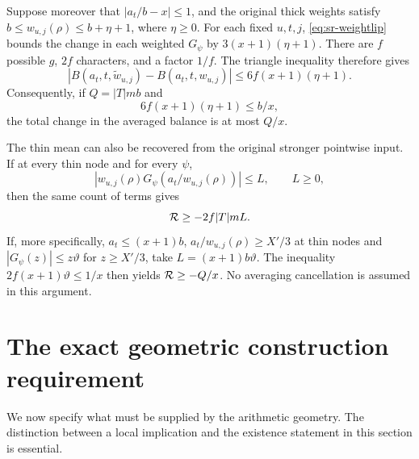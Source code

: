 Suppose moreover that \(|a_t/b-x|\leq1\), and the original thick weights
satisfy \(b\leq w_{u,j}(\rho)\leq b+\eta+1\), where \(\eta\geq0\).
For each fixed \(u,t,j\), \eqref{eq:sr-weightlip} bounds the change in
each weighted \(G_\psi\) by
\(3(x+1)(\eta+1)\).
There are \(f\) possible \(g\), \(2f\) characters, and a factor \(1/f\).
The triangle inequality therefore gives
\[
 |B(a_t,t,\widetilde w_{u,j})-B(a_t,t,w_{u,j})|
 \leq6f(x+1)(\eta+1).
\]
Consequently, if \(Q=|T|mb\) and
\begin{equation}\label{eq:sr-repair}
 6f(x+1)(\eta+1)\leq b/x,
\end{equation}
the total change in the averaged balance is at most \(Q/x\).

The thin mean can also be recovered from the original stronger
pointwise input. If at every thin node and for every \(\psi\),
\[
 |w_{u,j}(\rho)G_\psi(a_t/w_{u,j}(\rho))|\leq L,\qquad L\geq0,
\]
then the same count of terms gives
\begin{equation}\label{eq:sr-thin}
 {\cal R}\geq-2f|T|mL.
\end{equation}
If, more specifically, \(a_t\leq(x+1)b\),
\(a_t/w_{u,j}(\rho)\geq X'/3\) at thin nodes and
\(|G_\psi(z)|\leq z\vartheta\) for \(z\geq X'/3\), take
\(L=(x+1)b\vartheta\).
The inequality \(2f(x+1)\vartheta\leq1/x\) then yields
\({\cal R}\geq-Q/x\). No averaging cancellation is assumed in this argument.

\section{The exact geometric construction requirement}
\label{sec:sr-construction}
We now specify what must be supplied by the arithmetic geometry.
The distinction between a local implication and the existence statement
in this section is essential.

